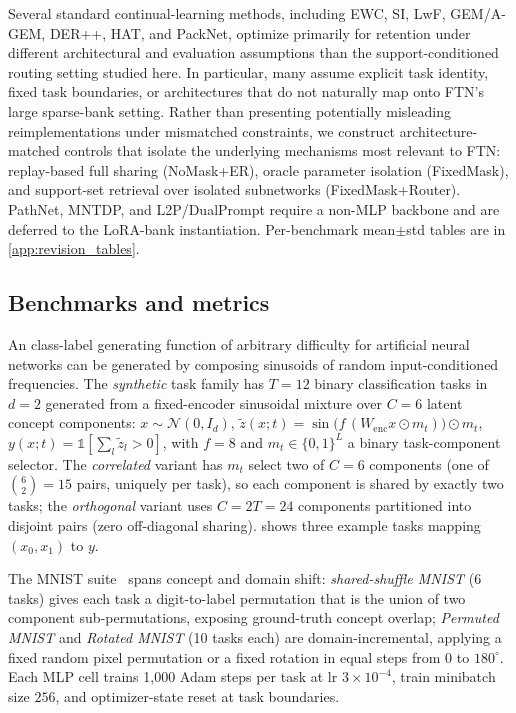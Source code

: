 \documentclass{article}
\begin{document}
Several standard continual-learning methods, including EWC, SI, LwF, GEM/A-GEM, DER++, HAT, and PackNet, optimize primarily for retention under different architectural and evaluation assumptions than the support-conditioned routing setting studied here. In particular, many assume explicit task identity, fixed task boundaries, or architectures that do not naturally map onto FTN’s large sparse-bank setting. Rather than presenting potentially misleading reimplementations under mismatched constraints, we construct architecture-matched controls that isolate the underlying mechanisms most relevant to FTN: replay-based full sharing (NoMask+ER), oracle parameter isolation (FixedMask), and support-set retrieval over isolated subnetworks (FixedMask+Router). PathNet, MNTDP, and L2P/DualPrompt require a non-MLP backbone and are deferred to the LoRA-bank instantiation. Per-benchmark mean$\pm$std tables are in \cref{app:revision_tables}.


\subsection{Benchmarks and metrics}\label{sec:setup}
An class-label generating function of arbitrary difficulty for artificial neural networks can be generated by composing sinusoids of random input-conditioned frequencies. The \emph{synthetic} task family has $T{=}12$ binary classification tasks in $d{=}2$ generated from a fixed-encoder sinusoidal mixture over $C{=}6$ latent concept components: $x \sim \mathcal{N}(0, I_d)$, $\tilde z(x; t) = \sin\!\bigl(f\,(W_\mathrm{enc} x \odot m_t)\bigr)\odot m_t$, $y(x;t)=\mathbb{1}[\sum_l \tilde z_l > 0]$, with $f{=}8$ and $m_t\in\{0,1\}^L$ a binary task-component selector. The \emph{correlated} variant has $m_t$ select two of $C{=}6$ components (one of $\binom{6}{2}{=}15$ pairs, uniquely per task), so each component is shared by exactly two tasks; the \emph{orthogonal} variant uses $C{=}2T{=}24$ components partitioned into disjoint pairs (zero off-diagonal sharing).  shows three example tasks mapping $(x_0, x_1)$ to $y$. 

The MNIST suite~\citep{lecun1998mnist} spans concept and domain shift: \emph{shared-shuffle MNIST} (6 tasks) gives each task a digit-to-label permutation that is the union of two component sub-permutations, exposing ground-truth concept overlap; \emph{Permuted MNIST} and \emph{Rotated MNIST} (10 tasks each) are domain-incremental, applying a fixed random pixel permutation or a fixed rotation in equal steps from $0$ to $180^\circ$. Each MLP cell trains 1{,}000 Adam steps per task at lr $3{\times}10^{-4}$, train minibatch size $256$, and optimizer-state reset at task boundaries.
\end{document}
